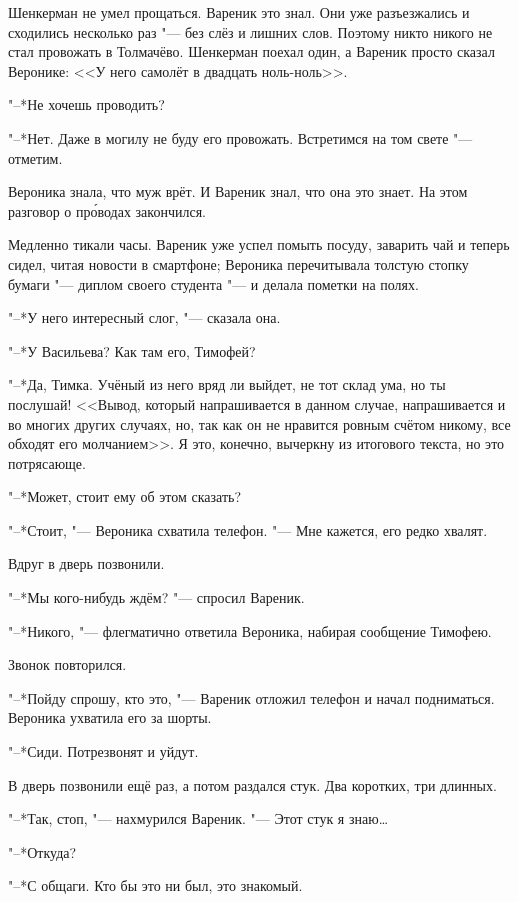 \asterism

\label{Fri_2012_10_19}

Шенкерман не умел прощаться.
Вареник это знал.
Они уже разъезжались и сходились несколько раз "--- без слёз и лишних слов.
Поэтому никто никого не стал провожать в Толмачёво.
Шенкерман поехал один, а Вареник просто сказал Веронике:
<<У него самолёт в двадцать ноль-ноль>>.

"--*Не хочешь проводить?

"--*Нет.
Даже в могилу не буду его провожать.
Встретимся на том свете "--- отметим.

Вероника знала, что муж врёт.
И Вареник знал, что она это знает.
На этом разговор о пр\'оводах закончился.

Медленно тикали часы.
Вареник уже успел помыть посуду, заварить чай и теперь сидел, читая новости в смартфоне;
Вероника перечитывала толстую стопку бумаги "--- диплом своего студента "--- и делала пометки на полях.

"--*У него интересный слог, "--- сказала она.

"--*У Васильева?
Как там его, Тимофей?

"--*Да, Тимка.
Учёный из него вряд ли выйдет, не тот склад ума, но ты послушай!
<<Вывод, который напрашивается в данном случае, напрашивается и во многих других случаях, но, так как он не нравится ровным счётом никому, все обходят его молчанием>>.
Я это, конечно, вычеркну из итогового текста, но это потрясающе.

"--*Может, стоит ему об этом сказать?

"--*Стоит, "--- Вероника схватила телефон.
"--- Мне кажется, его редко хвалят.

Вдруг в дверь позвонили.

"--*Мы кого-нибудь ждём? "--- спросил Вареник.

"--*Никого, "--- флегматично ответила Вероника, набирая сообщение Тимофею.

Звонок повторился.

"--*Пойду спрошу, кто это, "--- Вареник отложил телефон и начал подниматься.
Вероника ухватила его за шорты.

"--*Сиди.
Потрезвонят и уйдут.

В дверь позвонили ещё раз, а потом раздался стук.
Два коротких, три длинных.

"--*Так, стоп, "--- нахмурился Вареник.
"--- Этот стук я знаю\ldots{}

"--*Откуда?

"--*С общаги.
Кто бы это ни был, это знакомый.

